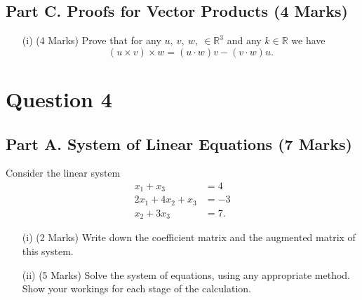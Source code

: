 \documentclass[a4paper,12pt]{article}
\begin{document}
	\subsection*{Part C. Proofs for Vector Products (4 Marks)}
	
	\begin{itemize}
		\item[(i)](4 Marks) Prove that for any $u,\:v,\:w,\:\in\mathbb{R}^3$
		and any $k\in\mathbb{R}$ we have \[(u\times v)\times w= (u\cdot w)v - (v\cdot w)u.\]
		
		
	\end{itemize} \vspace{0.4cm}

\newpage
 \section*{Question 4}
	\subsection*{Part A. System of Linear Equations (7 Marks)}
 Consider the linear system
		\begin{align*}
		x_1 + x_3 &= 4\\
		2x_1 + 4x_2 + x_3 &= -3\\
		x_2 + 3x_3 &= 7.
		\end{align*}
		\begin{itemize}
			\item[(i)] (2 Marks) Write down the coefficient matrix and the augmented matrix of this system.  %
			
			
			\item[(ii)] (5 Marks) Solve the system of equations, using any appropriate method. Show your workings for each stage of the calculation.
		\end{itemize}
\end{document}
